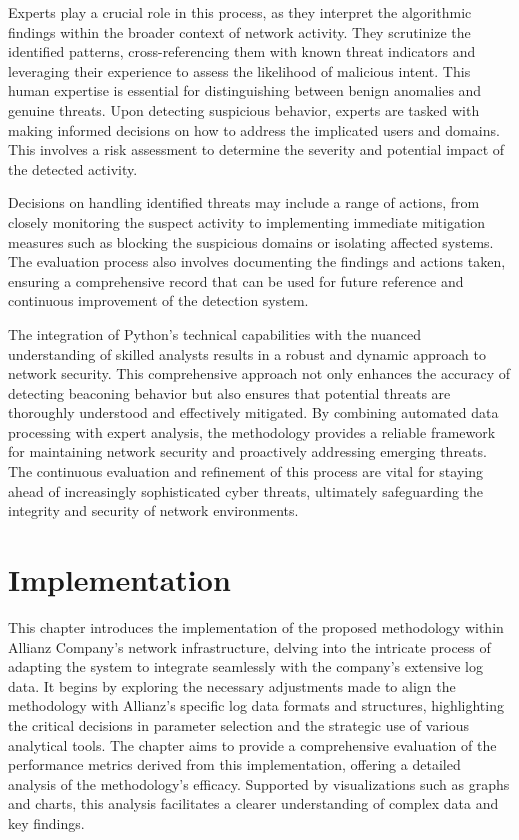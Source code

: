Experts play a crucial role in this process, as they interpret the algorithmic findings within the broader context of network activity. They scrutinize the identified patterns, cross-referencing them with known threat indicators and leveraging their experience to assess the likelihood of malicious intent. This human expertise is essential for distinguishing between benign anomalies and genuine threats. Upon detecting suspicious behavior, experts are tasked with making informed decisions on how to address the implicated users and domains. This involves a risk assessment to determine the severity and potential impact of the detected activity.

Decisions on handling identified threats may include a range of actions, from closely monitoring the suspect activity to implementing immediate mitigation measures such as blocking the suspicious domains or isolating affected systems. The evaluation process also involves documenting the findings and actions taken, ensuring a comprehensive record that can be used for future reference and continuous improvement of the detection system.

The integration of Python's technical capabilities with the nuanced understanding of skilled analysts results in a robust and dynamic approach to network security. This comprehensive approach not only enhances the accuracy of detecting beaconing behavior but also ensures that potential threats are thoroughly understood and effectively mitigated. By combining automated data processing with expert analysis, the methodology provides a reliable framework for maintaining network security and proactively addressing emerging threats. The continuous evaluation and refinement of this process are vital for staying ahead of increasingly sophisticated cyber threats, ultimately safeguarding the integrity and security of network environments.
\chapter{Implementation}
This chapter introduces the implementation of the proposed methodology within Allianz Company's network infrastructure, delving into the intricate process of adapting the system to integrate seamlessly with the company's extensive log data. It begins by exploring the necessary adjustments made to align the methodology with Allianz's specific log data formats and structures, highlighting the critical decisions in parameter selection and the strategic use of various analytical tools. The chapter aims to provide a comprehensive evaluation of the performance metrics derived from this implementation, offering a detailed analysis of the methodology's efficacy. Supported by visualizations such as graphs and charts, this analysis facilitates a clearer understanding of complex data and key findings.

